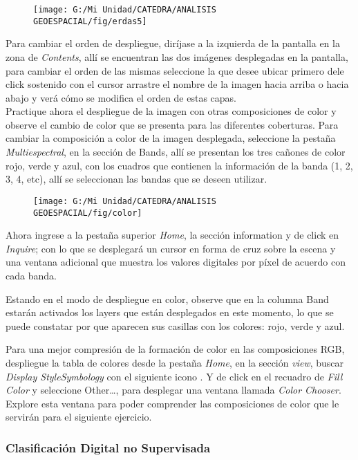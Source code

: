 \documentclass[a4paper,oneside,11pt,]{article}
\begin{document}
\begin{figure}
\centering
\texttt{[image: G:/Mi Unidad/CATEDRA/ANALISIS GEOESPACIAL/fig/erdas5]}
\end{figure}

Para cambiar el orden de despliegue, diríjase a la izquierda de la pantalla en la zona de \emph{Contents}, allí se encuentran las dos imágenes desplegadas en la pantalla, para cambiar el orden de las mismas seleccione la que desee ubicar primero dele click sostenido con el cursor arrastre el nombre de la imagen hacia arriba o hacia abajo y verá cómo se modifica el orden de estas capas.\\

Practique ahora el despliegue de la imagen con otras composiciones de color y observe el cambio de color que se presenta para las diferentes coberturas. Para cambiar la composición a color de la imagen desplegada, seleccione la pestaña \emph{Multiespectral}, en la sección de Bands, allí se presentan los tres cañones de color rojo, verde y azul, con los cuadros que contienen la información de la banda (1, 2, 3, 4, etc), allí se seleccionan las bandas que se deseen utilizar.

\begin{figure}
\centering
\texttt{[image: G:/Mi Unidad/CATEDRA/ANALISIS GEOESPACIAL/fig/color]}
\end{figure}

Ahora ingrese a la pestaña superior \emph{Home}, la sección information y de click en \emph{Inquire}; con lo que se desplegará un cursor en forma de cruz sobre la escena y una ventana adicional que muestra los valores digitales por píxel de acuerdo con cada banda.
\par Estando en el modo de despliegue en color, observe que en la columna Band estarán activados los layers que están desplegados en este momento, lo que se puede constatar por que aparecen sus casillas con los colores: rojo, verde y azul.
\par Para una mejor compresión de la formación de color en las composiciones RGB, despliegue la tabla de colores desde la pestaña \emph{Home}, en la sección \emph{view}, buscar \emph{Display Style\textrightarrow Symbology} con el siguiente icono . Y de click en el recuadro de \emph{Fill Color} y seleccione Other…, para desplegar una ventana llamada \emph{Color Chooser}. Explore esta ventana para poder comprender las composiciones de color que le servirán para el siguiente ejercicio.

\subsubsection{Clasificación Digital no Supervisada}
\end{document}
